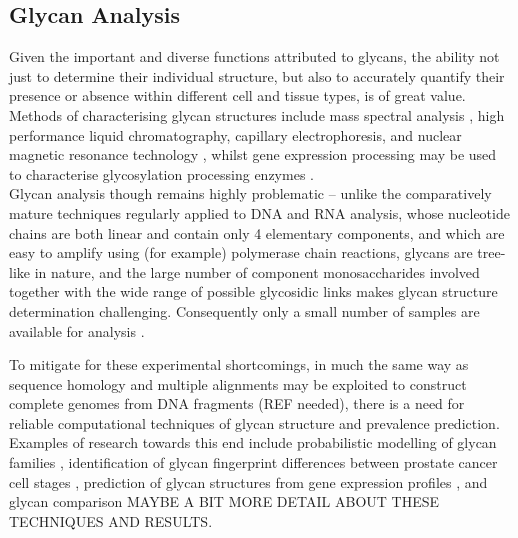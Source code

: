 \documentclass[12pt,a4paper]{article}
\begin{document}






\subsection{Glycan Analysis}
\label{sec:glycan_analysis}

Given the important and diverse functions attributed to glycans, the ability not just to determine their individual structure, but also to accurately quantify their presence or absence within different cell and tissue types, is of great value. Methods of characterising glycan structures include mass spectral analysis \citep{10.1371/journal.pcbi.1002813}, high performance liquid chromatography, capillary electrophoresis, and nuclear magnetic resonance technology \citep{von2004bioinformatics}, whilst gene expression processing may be used to characterise glycosylation processing enzymes \citep{10.1371/journal.pcbi.1002813}.\\

Glycan analysis though remains highly problematic -- unlike the comparatively mature techniques regularly applied to DNA and RNA analysis, whose nucleotide chains are both linear and contain only 4 elementary components, and which are easy to amplify using (for example) polymerase chain reactions, glycans are tree-like in nature, and the large number of component monosaccharides involved together with the wide range of possible glycosidic links makes glycan structure determination challenging. Consequently only a small number of samples are available for analysis \citep{doi:10.1093/bioinformatics/bti666}.

To mitigate for these experimental shortcomings, in much the same way as sequence homology and multiple alignments may be exploited to construct complete genomes from DNA fragments (REF needed), there is a need for reliable computational techniques of glycan structure and prevalence prediction. Examples of research towards this end include probabilistic modelling of glycan families \citep{ueda2005probabilistic}, identification of glycan fingerprint differences between prostate cancer cell stages \citep{10.1371/journal.pcbi.1002813}, prediction of glycan structures from gene expression profiles \citep{doi:10.1093/bioinformatics/bti666}, and glycan comparison \citep{aoki2004score, aoki2004kcam} MAYBE A BIT MORE DETAIL ABOUT THESE TECHNIQUES AND RESULTS.
\end{document}
